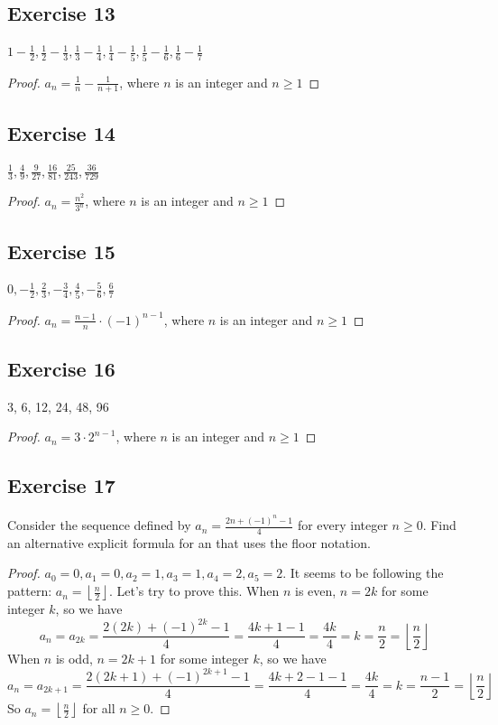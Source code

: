 \documentclass[14pt]{extarticle}
\newcommand{\dps}{\displaystyle}
\newcommand{\floor}[1]{{\left\lfloor#1\right\rfloor}}
\begin{document}
\subsection{Exercise 13}
$\dps 1 - \frac{1}{2}, \frac{1}{2} - \frac{1}{3}, \frac{1}{3} - \frac{1}{4}, \frac{1}{4} - \frac{1}{5}, \frac{1}{5} - \frac{1}{6}, \frac{1}{6} - \frac{1}{7}$

\begin{proof}
$\dps a_n = \frac{1}{n} - \frac{1}{n+1}$, where $n$ is an integer and $n \geq 1$
\end{proof}

\subsection{Exercise 14}
$\dps \frac{1}{3}, \frac{4}{9}, \frac{9}{27}, \frac{16}{81}, \frac{25}{243}, \frac{36}{729}$

\begin{proof}
$\dps a_n = \frac{n^2}{3^n}$, where $n$ is an integer and $n \geq 1$
\end{proof}

\subsection{Exercise 15}
$\dps 0, -\frac{1}{2}, \frac{2}{3}, -\frac{3}{4}, \frac{4}{5}, -\frac{5}{6}, \frac{6}{7}$

\begin{proof}
$\dps a_n = \frac{n-1}{n}\cdot(-1)^{n-1}$, where $n$ is an integer and $n \geq 1$
\end{proof}

\subsection{Exercise 16}
3, 6, 12, 24, 48, 96

\begin{proof}
$\dps a_n = 3\cdot 2^{n-1}$, where $n$ is an integer and $n \geq 1$
\end{proof}

\subsection{Exercise 17}
Consider the sequence defined by $\dps a_n = \frac{2n + (-1)^n - 1}{4}$ for every integer $n \geq 0$. Find an alternative explicit formula for an that uses the floor notation.

\begin{proof}
$a_0 = 0, a_1 = 0, a_2 = 1, a_3 = 1, a_4 = 2, a_5 = 2$. It seems to be following the pattern: $\dps a_n = \floor{\frac{n}{2}}$. Let's try to prove this. When $n$ is even, $n = 2k$ for some integer $k$, so we have
\[
a_n = a_{2k} = \frac{2(2k) + (-1)^{2k} - 1}{4} = \frac{4k + 1 - 1}{4} = \frac{4k}{4} = k = \frac{n}{2} = \floor{\frac{n}{2}}
\]
When $n$ is odd, $n = 2k+1$ for some integer $k$, so we have
\[
a_n = a_{2k+1} = \frac{2(2k+1) + (-1)^{2k+1} - 1}{4} = \frac{4k + 2 - 1 - 1}{4} = \frac{4k}{4} = k = \frac{n-1}{2} = \floor{\frac{n}{2}}
\]
So $\dps a_n = \floor{\frac{n}{2}}$ for all $n \geq 0$.
\end{proof}
\end{document}
